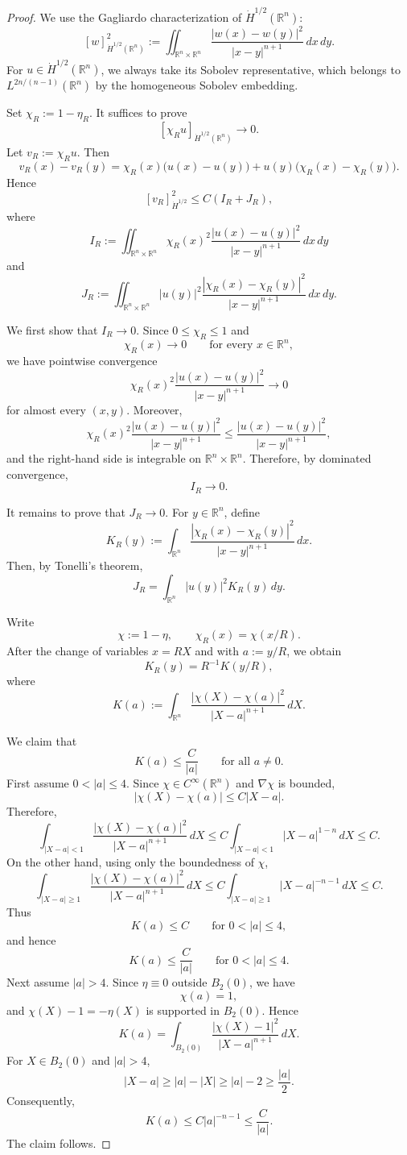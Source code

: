 \documentclass[a4paper, 12pt]{article}
\begin{document}
\begin{proof}
	We use the Gagliardo characterization of $\dot H^{1/2}(\mathbb R^n)$:
	\[
	[w]_{\dot H^{1/2}(\mathbb R^n)}^2:=
	\iint_{\mathbb R^n\times\mathbb R^n}
	\frac{|w(x)-w(y)|^2}{|x-y|^{n+1}}\,dx\,dy.
	\]
	For $u\in \dot H^{1/2}(\mathbb R^n)$, we always take its Sobolev representative, which belongs to
	$L^{2n/(n-1)}(\mathbb R^n)$ by the homogeneous Sobolev embedding.
	
	Set $\chi_R:=1-\eta_R$.	It suffices to prove
	\[
	[\chi_Ru]_{\dot H^{1/2}(\mathbb R^n)}\to0.
	\]
	Let $v_R:=\chi_Ru$.	Then
	\[
	v_R(x)-v_R(y)
	=
	\chi_R(x)\bigl(u(x)-u(y)\bigr)
	+
	u(y)\bigl(\chi_R(x)-\chi_R(y)\bigr).
	\]
	Hence
	\[
	[v_R]_{\dot H^{1/2}}^2
	\le C(I_R+J_R),
	\]
	where
	\[
	I_R
	:=
	\iint_{\mathbb R^n\times\mathbb R^n}
	\chi_R(x)^2
	\frac{|u(x)-u(y)|^2}{|x-y|^{n+1}}
	\,dx\,dy
	\]
	and
	\[
	J_R
	:=
	\iint_{\mathbb R^n\times\mathbb R^n}
	|u(y)|^2
	\frac{|\chi_R(x)-\chi_R(y)|^2}{|x-y|^{n+1}}
	\,dx\,dy.
	\]
	
	We first show that $I_R\to0$. Since $0\le \chi_R\le1$ and
	\[
	\chi_R(x)\to0
	\qquad\text{for every }x\in\mathbb R^n,
	\]
	we have pointwise convergence
	\[
	\chi_R(x)^2
	\frac{|u(x)-u(y)|^2}{|x-y|^{n+1}}
	\to0
	\]
	for almost every $(x,y)$. Moreover,
	\[
	\chi_R(x)^2
	\frac{|u(x)-u(y)|^2}{|x-y|^{n+1}}
	\le
	\frac{|u(x)-u(y)|^2}{|x-y|^{n+1}},
	\]
	and the right-hand side is integrable on
	$\mathbb R^n\times\mathbb R^n$. Therefore, by dominated convergence,
	\[
	I_R\to0.
	\]
	
	It remains to prove that $J_R\to0$. For $y\in\mathbb R^n$, define
	\[
	K_R(y)
	:=
	\int_{\mathbb R^n}
	\frac{|\chi_R(x)-\chi_R(y)|^2}{|x-y|^{n+1}}\,dx.
	\]
	Then, by Tonelli's theorem,
	\[
	J_R
	=
	\int_{\mathbb R^n}
	|u(y)|^2K_R(y)\,dy.
	\]
	
	Write
	\[
	\chi:=1-\eta,
	\qquad
	\chi_R(x)=\chi(x/R).
	\]
	After the change of variables $x=RX$ and with $a:=y/R$, we obtain
	\[
	K_R(y)
	=
	R^{-1}K(y/R),
	\]
	where
	\[
	K(a)
	:=
	\int_{\mathbb R^n}
	\frac{|\chi(X)-\chi(a)|^2}{|X-a|^{n+1}}\,dX.
	\]
	
	We claim that
	\[
	K(a)\le \frac{C}{|a|}
	\qquad\text{for all }a\neq0.
	\]
	First assume $0<|a|\le4$. Since $\chi\in C^\infty(\mathbb R^n)$ and
	$\nabla\chi$ is bounded,
	\[
	|\chi(X)-\chi(a)|
	\le C|X-a|.
	\]
	Therefore,
	\[
	\int_{|X-a|<1}
	\frac{|\chi(X)-\chi(a)|^2}{|X-a|^{n+1}}\,dX
	\le
	C\int_{|X-a|<1}|X-a|^{1-n}\,dX
	\le C.
	\]
	On the other hand, using only the boundedness of $\chi$,
	\[
	\int_{|X-a|\ge1}
	\frac{|\chi(X)-\chi(a)|^2}{|X-a|^{n+1}}\,dX
	\le
	C\int_{|X-a|\ge1}|X-a|^{-n-1}\,dX
	\le C.
	\]
	Thus
	\[
	K(a)\le C
	\qquad\text{for }0<|a|\le4,
	\]
	and hence
	\[
	K(a)\le \frac{C}{|a|}
	\qquad\text{for }0<|a|\le4.
	\]
	Next assume $|a|>4$. Since $\eta\equiv0$ outside $B_2(0)$, we have
	\[
	\chi(a)=1,
	\]
	and $\chi(X)-1=-\eta(X)$ is supported in $B_2(0)$. Hence
	\[
	K(a)
	=
	\int_{B_2(0)}
	\frac{|\chi(X)-1|^2}{|X-a|^{n+1}}\,dX.
	\]
	For $X\in B_2(0)$ and $|a|>4$,
	\[
	|X-a|\ge |a|-|X|\ge |a|-2\ge \frac{|a|}{2}.
	\]
	Consequently,
	\[
	K(a)
	\le
	C|a|^{-n-1}
	\le
	\frac{C}{|a|}.
	\]
	The claim follows.
	

\end{proof}
\end{document}
